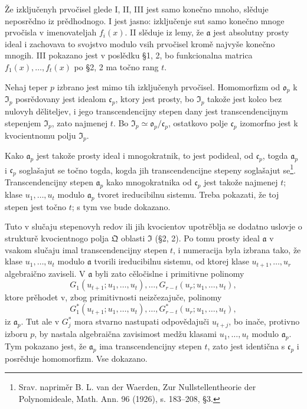 \documentclass[11pt]{article}
\begin{document}
Že izključenyh prvočisel glede I, II, III jest samo konečno mnoho, slěduje neposrědno iz prědhodnogo. I jest jasno: izključenje sut samo konečno mnoge prvočisla v imenovateljah \(f_i(x)\). II slěduje iz lemy, že \(\mathfrak{a}\) jest absolutny prosty ideal i zachovava to svojstvo modulo vsih prvočisel kromě najvyše konečno mnogih. III pokazano jest v poslědku §1, 2, bo funkcionalna matrica \(f_1(x),\ldots,f_t(x)\) po §2, 2 ma točno rang \(t\).

Nehaj teper \(p\) izbrano jest mimo tih izključenyh prvočisel. Homomorfizm od \(\mathfrak{o}_p\) k \(\mathfrak{I}_p\) posrědovany jest idealom \(\mathfrak{c}_p\), ktory jest prosty, bo \(\mathfrak{I}_p\) takože jest kolco bez nulovyh děliteljev, i jego transcendencijny stepen dany jest transcendencijnym stepenjem \(\mathfrak{I}_p\), zato najmenej \(t\). Bo \(\mathfrak{I}_p\simeq\mathfrak{o}_p/\mathfrak{c}_p\), ostatkovo polje \(\mathfrak{c}_p\) izomorfno jest k kvocientnomu polju \(\mathfrak{I}_p\).

Kako \(\mathfrak{a}_p\) jest takože prosty ideal i mnogokratnik, to jest podideal, od \(\mathfrak{c}_p\), togda \(\mathfrak{a}_p\) i \(\mathfrak{c}_p\) soglašajut se točno togda, kogda jih transcendencijne stepeny soglašajut se\footnote{Srav. napriměr B. L. van der Waerden, Zur Nullstellentheorie der Polynomideale, Math. Ann. 96 (1926), s. 183--208, §3.}. Transcendencijny stepen \(\mathfrak{a}_p\) kako mnogokratnika od \(\mathfrak{c}_p\) jest takože najmenej \(t\); klase \(u_1,\ldots,u_t\) modulo \(\mathfrak{a}_p\) tvoret ireducibilnu sistemu. Treba pokazati, že toj stepen jest točno \(t\); s tym vse bude dokazano.

Tuto v slučaju stepenovyh redov ili jih kvocientov upotrěblja se dodatno uslovje o strukturě kvocientnogo polja \(\mathfrak{Q}\) oblasti \(\mathfrak{I}\) (§2, 2). Po tomu prosty ideal \(\mathfrak{a}\) v vsakom slučaju imal transcendencijny stepen \(t\), i numeracija byla izbrana tako, že klase \(u_1,\ldots,u_t\) modulo \(\mathfrak{a}\) tvorili ireducibilnu sistemu, od ktorej klase \(u_{t+1},\ldots,u_r\) algebraično zaviseli. V \(\mathfrak{a}\) byli zato cěločislne i primitivne polinomy
\[
G_1(u_{t+1};u_1,\ldots,u_t),\ldots,G_{r-t}(u_r;u_1,\ldots,u_t),\tag{1}
\]
ktore prěhodet v, zbog primitivnosti neizčezajuče, polinomy
\[
G^*_1(u_{t+1};u_1,\ldots,u_t),\ldots,G^*_{r-t}(u_r;u_1,\ldots,u_t),\tag{2}
\]
iz \(\mathfrak{a}_p\). Tut ale v \(G^*_j\) mora stvarno nastupati odpovědajuči \(u_{t+j}\), bo inače, protivno izboru \(p\), by nastala algebraična zavisimost medžu klasami \(u_1,\ldots,u_t\) modulo \(\mathfrak{a}_p\). Tym pokazano jest, že \(\mathfrak{a}_p\) ima transcendencijny stepen \(t\), zato jest identična s \(\mathfrak{c}_p\) i posrěduje homomorfizm. Vse dokazano.
\end{document}
